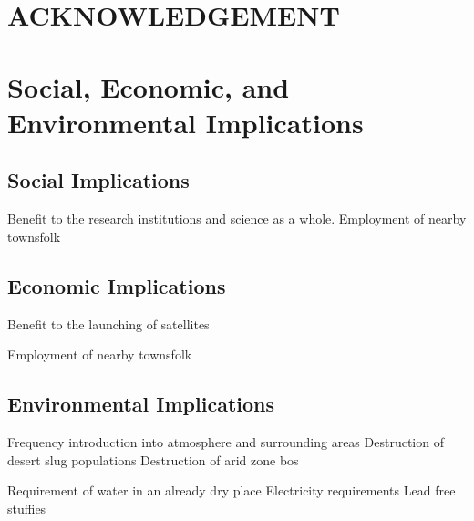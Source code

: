 \documentclass[11pt]{witseiepaper}
\begin{document}
\section*{ACKNOWLEDGEMENT} \label{sec:ACKNOWLEDGEMENT}








\newpage
\onecolumn
{}
\setcounter{page}{1}
\setcounter{figure}{0} 
\renewcommand{\thefigure}
{A\arabic{figure}}

\onecolumn
\appendix

\section{Social, Economic, and Environmental Implications}

\subsection{Social Implications} \label{sec:SocialImplications}
Benefit to the research institutions and science as a whole.
Employment of nearby townsfolk


\subsection{Economic Implications} \label{sec:EconomicImplications}
Benefit to the launching of satellites

Employment of nearby townsfolk


\subsection{Environmental Implications} \label{sec:EnvironmentalImplications}
Frequency introduction into atmosphere and surrounding areas
Destruction of desert slug populations
Destruction of arid zone bos

Requirement of water in an already dry place
Electricity requirements
Lead free stuffies
\end{document}
